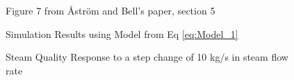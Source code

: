        \begin{figure}[ht]
            \begin{center}
                
                Figure 7 from \r{A}str\"{o}m and Bell's paper, section 5 \cite{Astrom}
                
                
                Simulation Results using Model from Eq \eqref{eq:Model_1}
                
                \caption{Steam Quality Response to a step change of 10 kg/s in steam flow rate}
                \label{fig:Fig7F}
            \end{center}
        \end{figure}  %

